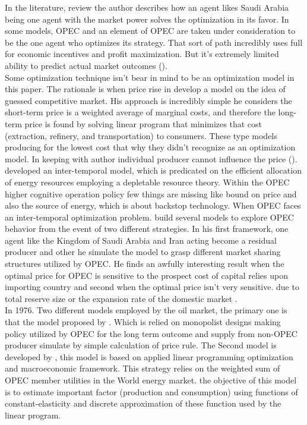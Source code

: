In the literature, review the author describes how an agent likes Saudi Arabia being one agent with the market power solves the optimization in its favor. In some models, OPEC and an element of OPEC are taken under consideration to be the one agent who optimizes its strategy. That sort of path incredibly uses full for economic incentives and profit maximization. But it's extremely limited ability to predict actual market outcomes (\cite{huntington2013oil}).\\ 


Some optimization technique isn't bear in mind to be an optimization model in this paper. The rationale is when price rise in \cite{deam1973world} develop a model on the idea of guessed competitive market. His approach is incredibly simple he considers the short-term price is a weighted average of marginal costs, and therefore the long-term price is found by solving linear program that minimizes that cost (extraction, refinery, and transportation) to consumers. These type models producing for the lowest cost that why they didn't recognize as an optimization model. In keeping with author individual producer cannot influence the price (\cite{huntington2013oil}).\\ 

\cite{kalymon1975economic} developed an inter-temporal model, which is predicated on the efficient allocation of energy resources employing a depletable resource theory. Within the OPEC higher cognitive operation policy few things are missing like bound on price and also the source of energy, which is about backstop technology. When OPEC faces an inter-temporal optimization problem. \cite{kalymon1975economic} build several models to explore OPEC behavior from the event of two different strategies. In his first framework, one agent like the Kingdom of Saudi Arabia and Iran acting become a residual producer and other he simulate the model to grasp different market sharing structures utilized by OPEC. He finds an awfully interesting result when the optimal price for OPEC is sensitive to the prospect cost of capital relies upon importing country and second when the optimal price isn't very sensitive. due to total reserve size or the expansion rate of the domestic market .\\

In 1976. Two different models employed by the oil market, the primary one is that the model proposed by \cite{ben1976oil}. Which is relied on monopolist designs making policy utilized by OPEC for the long term outcome and supply from non-OPEC producer simulate by simple calculation of price rule. The Second model is developed by \cite{ezzati1976future}, this model is based on applied linear programming optimization and macroeconomic framework. This strategy relies on the weighted sum of OPEC member utilities in the World energy market. the objective of this model is to estimate important factor (production and consumption) using functions of constant-elasticity and discrete approximation of these function used by the linear program.\\

